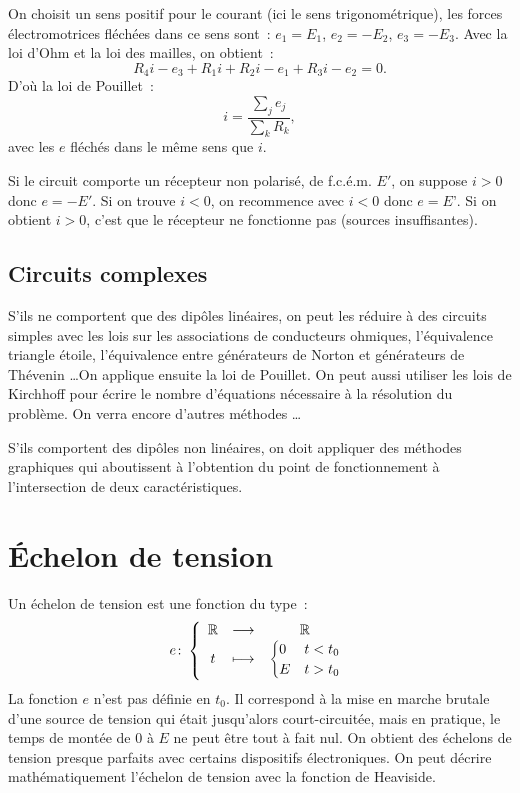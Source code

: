 On choisit un sens positif  pour le courant (ici le sens trigonométrique), les 
forces électromotrices fléchées dans ce sens sont~: \(e_1 = E_1\),
\(e_2 = - E_2\), \(e_3 = - E_3\).
Avec la loi d'Ohm et la loi  des mailles, on obtient~:
\begin{equation}%
  R_4 i - e_3 + R_1 i + R_2 i - e_1 + R_3 i - e_2 = 0.
\end{equation}%
D'où la loi de Pouillet~:
\begin{equation}%
  i = \frac{\sum_{j} e_j}{\sum_k R_k},
\end{equation}%
avec les \(e\) fléchés dans le même sens que \(i\).

Si le circuit comporte un récepteur non polarisé, de f.c.é.m. \(E'\), on 
suppose \(i > 0\) donc \(e = -E'\). Si on trouve \(i < 0\), on recommence avec 
\(i < 0\) donc \(e = E’\). Si on obtient \(i > 0\), c'est que le récepteur ne 
fonctionne pas (sources insuffisantes).
\subsection{Circuits complexes}%
S'ils ne comportent que des dipôles linéaires, on peut les réduire à des 
circuits simples avec les lois sur les associations de conducteurs ohmiques, 
l'équivalence triangle étoile, l'équivalence entre générateurs de Norton et 
générateurs de Thévenin \ldots On applique ensuite la loi de Pouillet. On peut 
aussi utiliser les lois de Kirchhoff pour écrire le nombre d'équations 
nécessaire à la résolution du problème. On verra encore d'autres méthodes 
\ldots

S'ils comportent des dipôles non linéaires, on doit appliquer des méthodes 
graphiques qui aboutissent à l'obtention du point de fonctionnement à 
l’intersection de deux caractéristiques.
\section{Échelon de tension}%
Un échelon de tension est une fonction du type~:
\begin{equation}%
  \fonction{e}{\R}{\R}{t}{%
    \begin{cases}
      0 & t < t_0 \\
      E & t > t_0
    \end{cases}
  }
\end{equation}%
La fonction \(e\) n'est pas définie en \(t_0\). Il correspond à la mise en 
marche brutale d'une source de tension qui était jusqu'alors court-circuitée, 
mais en pratique, le temps de montée de \(0\) à \(E\) ne peut être tout à fait 
nul. On obtient des échelons de tension presque parfaits avec certains 
dispositifs électroniques. On peut décrire mathématiquement l'échelon de 
tension avec la fonction de Heaviside.

